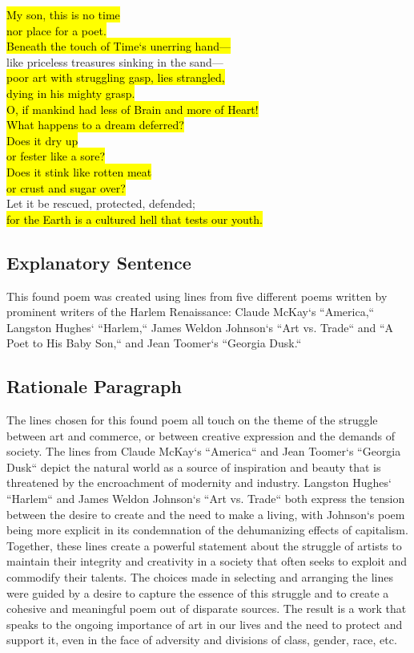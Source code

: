 \documentclass[stu]{apa7}
\begin{document}
\hl{My son, this is no time} \\
\hl{nor place for a poet.} \\
\vspace{5mm}
\hl{Beneath the touch of Time`s unerring hand---} \\
{like priceless treasures sinking in the sand---} \\
\hl{poor art with struggling gasp, lies strangled,} \\
\hl{dying in his mighty grasp.} \\
\hl{O, if mankind had less of Brain and more of Heart!} \\
\vspace{5mm}
\hl{What happens to a dream deferred?} \\
\hl{Does it dry up} \\
\hl{or fester like a sore?} \\
\hl{Does it stink like rotten meat} \\
\hl{or crust and sugar over?} \\
Let it be rescued, protected, defended; \\
\hl{for the Earth is a cultured hell that tests our youth.} \\
\vspace{5mm}

\subsection{Explanatory Sentence}
This found poem was created using lines from five different poems written by prominent writers of the Harlem Renaissance: Claude McKay`s ``America,`` Langston Hughes` ``Harlem,`` James Weldon Johnson`s ``Art vs. Trade`` and ``A Poet to His Baby Son,`` and Jean Toomer`s ``Georgia Dusk.``

\subsection{Rationale Paragraph}
\indent The lines chosen for this found poem all touch on the theme of the struggle between art and commerce, or between creative expression and the demands of society. The lines from Claude McKay`s ``America`` and Jean Toomer`s ``Georgia Dusk`` depict the natural world as a source of inspiration and beauty that is threatened by the encroachment of modernity and industry. Langston Hughes` ``Harlem`` and James Weldon Johnson`s ``Art vs. Trade`` both express the tension between the desire to create and the need to make a living, with Johnson`s poem being more explicit in its condemnation of the dehumanizing effects of capitalism. Together, these lines create a powerful statement about the struggle of artists to maintain their integrity and creativity in a society that often seeks to exploit and commodify their talents. The choices made in selecting and arranging the lines were guided by a desire to capture the essence of this struggle and to create a cohesive and meaningful poem out of disparate sources. The result is a work that speaks to the ongoing importance of art in our lives and the need to protect and support it, even in the face of adversity and divisions of class, gender, race, etc. 
\end{document}
